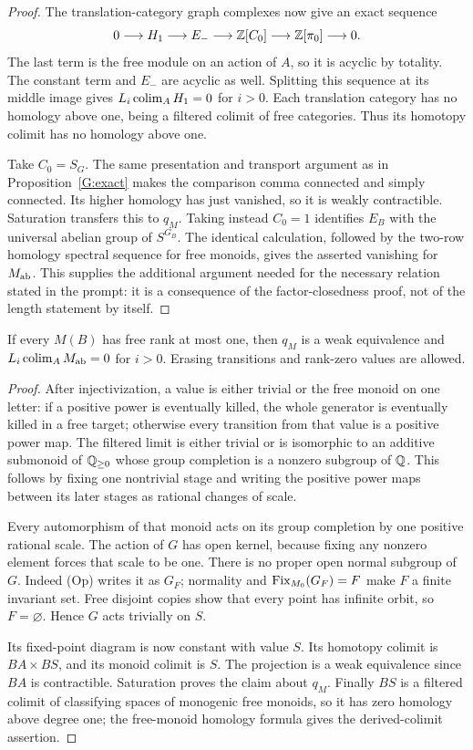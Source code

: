 \begin{proof}
The translation-category graph complexes now give an exact sequence
\[
 0\longrightarrow H_1\longrightarrow E_-
 \longrightarrow\mathbb Z[C_0]
 \longrightarrow\mathbb Z[\pi_0]\longrightarrow0.
\]
The last term is the free module on an action of $A$, so it is
acyclic by totality.  The constant term and $E_-$ are acyclic as
well.  Splitting this sequence at its middle image gives
$L_i\operatorname*{colim}_A H_1=0$ for $i>0$.  Each translation category has no
homology above one, being a filtered colimit of free categories.
Thus its homotopy colimit has no homology above one.

Take $C_0=S_G$.  The same presentation and transport argument as in
Proposition~\ref{G:exact} makes the comparison comma connected and
simply connected.  Its higher homology has just vanished, so it is
weakly contractible.  Saturation transfers this to $q_M$.
Taking instead $C_0=1$ identifies $E_B$ with the universal abelian
group of $S^{G_B}$.  The identical calculation, followed by the
two-row homology spectral sequence for free monoids, gives the
asserted vanishing for $M_{\mathrm{ab}}$.
This supplies the additional argument needed for the necessary
relation stated in the prompt: it is a consequence of the
factor-closedness proof, not of the length statement by itself.
\end{proof}

\begin{proposition}
\label{G:rankone}
If every $M(B)$ has free rank at most one, then $q_M$ is a weak
equivalence and $L_i\operatorname*{colim}_A M_{\mathrm{ab}}=0$ for $i>0$.  Erasing
transitions and rank-zero values are allowed.
\end{proposition}
\begin{proof}
After injectivization, a value is either trivial or the free monoid
on one letter: if a positive power is eventually killed, the whole
generator is eventually killed in a free target; otherwise every
transition from that value is a positive power map.  The filtered
limit is either trivial or is isomorphic to an additive submonoid
of $\mathbb Q_{\ge0}$ whose group completion is a nonzero subgroup of
$\mathbb Q$.  This follows by fixing one nontrivial stage and writing the
positive power maps between its later stages as rational changes
of scale.

Every automorphism of that monoid acts on its group completion by
one positive rational scale.  The action of $G$ has open kernel,
because fixing any nonzero element forces that scale to be one.
There is no proper open normal subgroup of $G$.  Indeed (Op)
writes it as $G_F$; normality and $\operatorname{Fix}_{M_0}(G_F)=F$ make $F$
a finite invariant set.  Free disjoint copies show that every
point has infinite orbit, so $F=\varnothing$.  Hence $G$ acts
trivially on $S$.

Its fixed-point diagram is now constant with value $S$.  Its
homotopy colimit is $BA\times BS$, and its monoid colimit is
$S$.  The projection is a weak equivalence since $BA$ is
contractible.  Saturation proves the claim about $q_M$.  Finally
$BS$ is a filtered colimit of classifying spaces of monogenic
free monoids, so it has zero homology above degree one; the
free-monoid homology formula gives the derived-colimit assertion.
\end{proof}

